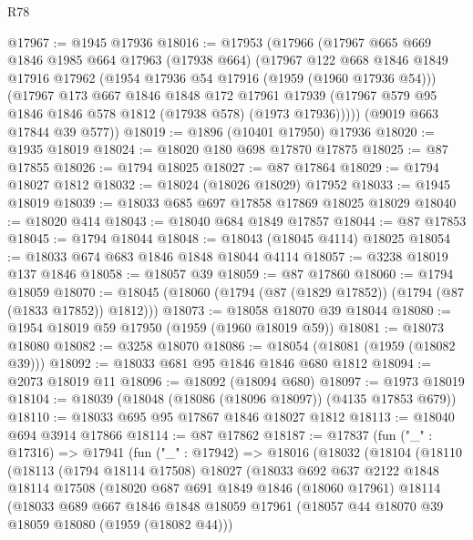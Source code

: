 \begin{lexlean}{R78}
\begin{coremodule}
@17967 := @1945 @17936
@18016 := @17953
    (@17966
      (@17967
        @665
        @669
        @1846
        @1985
        @664
        @17963
        (@17938 @664)
        (@17967
          @122
          @668
          @1846
          @1849
          @17916
          @17962
          (@1954 @17936 @54 @17916 (@1959 (@1960 @17936 @54)))
          (@17967
            @173
            @667
            @1846
            @1848
            @172
            @17961
            @17939
            (@17967 @579 @95 @1846 @1846 @578 @1812 (@17938 @578) (@1973 @17936)))))
      (@9019 @663 @17844 @39 @577))
@18019 := @1896 (@10401 @17950) @17936
@18020 := @1935 @18019
@18024 := @18020 @180 @698 @17870 @17875
@18025 := @87 @17855
@18026 := @1794 @18025
@18027 := @87 @17864
@18029 := @1794 @18027 @1812
@18032 := @18024 (@18026 @18029) @17952
@18033 := @1945 @18019
@18039 := @18033 @685 @697 @17858 @17869 @18025 @18029
@18040 := @18020 @414
@18043 := @18040 @684 @1849 @17857
@18044 := @87 @17853
@18045 := @1794 @18044
@18048 := @18043 (@18045 @4114) @18025
@18054 := @18033 @674 @683 @1846 @1848 @18044 @4114
@18057 := @3238 @18019 @137 @1846
@18058 := @18057 @39
@18059 := @87 @17860
@18060 := @1794 @18059
@18070 := @18045 (@18060 (@1794 (@87 (@1829 @17852)) (@1794 (@87 (@1833 @17852)) @1812)))
@18073 := @18058 @18070 @39 @18044
@18080 := @1954 @18019 @59 @17950 (@1959 (@1960 @18019 @59))
@18081 := @18073 @18080
@18082 := @3258 @18070
@18086 := @18054 (@18081 (@1959 (@18082 @39)))
@18092 := @18033 @681 @95 @1846 @1846 @680 @1812
@18094 := @2073 @18019 @11
@18096 := @18092 (@18094 @680)
@18097 := @1973 @18019
@18104 := @18039 (@18048 (@18086 (@18096 @18097)) (@4135 @17853 @679))
@18110 := @18033 @695 @95 @17867 @1846 @18027 @1812
@18113 := @18040 @694 @3914 @17866
@18114 := @87 @17862
@18187 := @17837
    (fun ("_" : @17316) =>
    @17941
      (fun ("_" : @17942) =>
      @18016
        (@18032
          (@18104
            (@18110
              (@18113
                (@1794 @18114 @17508)
                @18027
                (@18033
                  @692
                  @637
                  @2122
                  @1848
                  @18114
                  @17508
                  (@18020
                    @687
                    @691
                    @1849
                    @1846
                    (@18060 @17961)
                    @18114
                    (@18033
                      @689
                      @667
                      @1846
                      @1848
                      @18059
                      @17961
                      (@18057 @44 @18070 @39 @18059 @18080 (@1959 (@18082 @44)))

\end{coremodule}
\end{lexlean}
